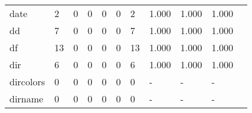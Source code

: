 \begin{longtable}{lp{1.2cm}p{1.2cm}p{1.2cm}p{1.2cm}p{1.2cm}p{1.2cm}p{1.2cm}p{1.2cm}p{1.2cm}p{1.2cm}}
date      &                                     2 &                                                  0 &                                                  0 &                                                  0 &                                                  0 &                                                  2 &                                              1.000 &                                              1.000 &                                              1.000 \\
dd        &                                     7 &                                                  0 &                                                  0 &                                                  0 &                                                  0 &                                                  7 &                                              1.000 &                                              1.000 &                                              1.000 \\
df        &                                    13 &                                                  0 &                                                  0 &                                                  0 &                                                  0 &                                                 13 &                                              1.000 &                                              1.000 &                                              1.000 \\
dir       &                                     6 &                                                  0 &                                                  0 &                                                  0 &                                                  0 &                                                  6 &                                              1.000 &                                              1.000 &                                              1.000 \\
dircolors &                                     0 &                                                  0 &                                                  0 &                                                  0 &                                                  0 &                                                  0 &                                                  - &                                                  - &                                                  - \\
dirname   &                                     0 &                                                  0 &                                                  0 &                                                  0 &                                                  0 &                                                  0 &                                                  - &                                                  - &                                                  - \\

\end{longtable}
